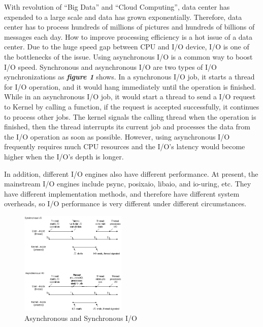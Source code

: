 \documentclass[conference]{IEEEtran}
\begin{document}

With revolution of “Big Data” and “Cloud Computing”, data center has expended to a large scale and data has grown exponentially.
Therefore, data center has to process hundreds of millions of pictures and hundreds of billions of messages each day.
How to improve processing efficiency is a hot issue of a data center.
Due to the huge speed gap between CPU and I/O device, I/O is one of the bottlenecks of the issue.
Using asynchronous I/O is a common way to boost I/O speed. Synchronous and asynchronous I/O are two types of I/O synchronizations as  \emph{\textbf{\large{figure 1}}} shows.
In a synchronous I/O job, it starts a thread for I/O operation, and it would hang immediately until the operation is finished.
While in an asynchronous I/O job, it would start a thread to send a I/O request to Kernel by calling a function, if the request is accepted successfully, it continues to process other jobs.
The kernel signals the calling thread when the operation is finished, then the thread interrupts its current job and processes the data from the I/O operation as soon as possible.
However, using asynchronous I/O frequently requires much CPU resources and the I/O's latency would become higher when the I/O's depth is longer.

In addition, different I/O engines also have different performance. At present, the mainstream I/O engines include psync, posixaio, libaio, and io-uring, etc. 
They have different implementation methods, and therefore have different system overheads, so I/O performance is very different under different circumstances.

\begin{figure}[htbp]
	\centering
	\includegraphics[width=0.45\textwidth]{fig2bedit.png}
	\caption{Asynchronous and Synchronous I/O}
\end{figure}
\end{document}
